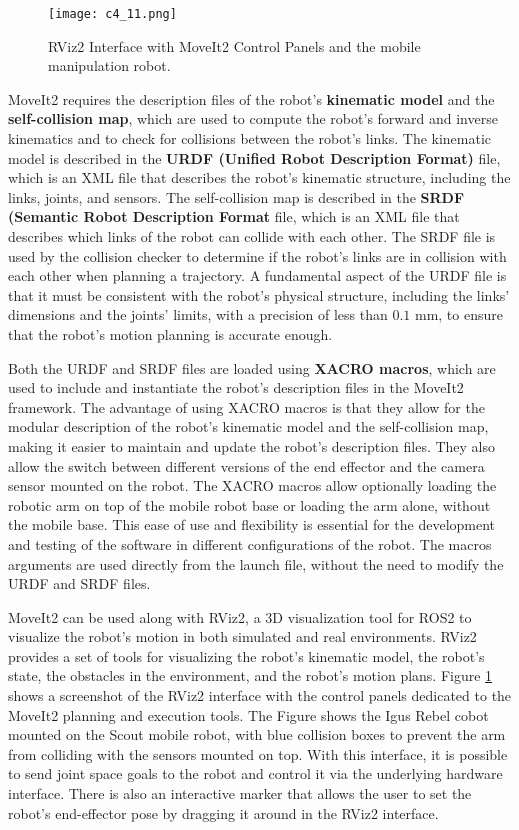 \begin{figure}[t]
    \centering
    \texttt{[image: c4\_11.png]}
    \caption{RViz2 Interface with MoveIt2 Control Panels and the mobile manipulation robot.}
    \label{fig:rviz2}
\end{figure}

MoveIt2 requires the description files of the robot's \textbf{kinematic model} and the \textbf{self-collision map},
which are used to compute the robot's forward and inverse kinematics and to check for collisions between the robot's
links. The kinematic model is described in the \textbf{URDF (Unified Robot Description Format)} file, which is an XML file
that describes the robot's kinematic structure, including the links, joints, and sensors. The self-collision map
is described in the \textbf{SRDF (Semantic Robot Description Format} file, which is an XML file that describes which links
of the robot can collide with each other. The SRDF file is used by the collision checker to determine if the robot's
links are in collision with each other when planning a trajectory. A fundamental aspect of the URDF file is that
it must be consistent with the robot's physical structure, including the links' dimensions and the joints' limits,
with a precision of less than $0.1$ mm, to ensure that the robot's motion planning is accurate enough.

Both the URDF and SRDF files are loaded using
\textbf{XACRO macros}, which are used to include and instantiate the robot's description files in the MoveIt2 framework.
The advantage of using XACRO macros is that they allow for the modular description of the robot's kinematic model
and the self-collision map, making it easier to maintain and update the robot's description files. They also allow
the switch between different versions of the end effector and the camera sensor mounted on the robot. The
XACRO macros allow optionally loading the robotic arm on top of the mobile robot base or loading the arm alone,
without the mobile base. This ease of use and flexibility is essential for the development and testing of the software
in different configurations of the robot. The macros arguments are used
directly from the launch file, without the need to modify the URDF and SRDF files.

MoveIt2 can be used along with RViz2, a 3D visualization tool for ROS2 to visualize the
robot's motion in both simulated and real environments. RViz2 provides a set of tools for visualizing the robot's
kinematic model, the robot's state, the obstacles in the environment, and the robot's motion plans.
Figure \ref{fig:rviz2} shows a screenshot of the RViz2 interface with the control panels dedicated to the MoveIt2
planning and execution tools. The Figure shows the Igus Rebel cobot mounted on the Scout mobile robot,
with blue collision boxes to prevent the arm from colliding with the sensors mounted on top.
With this interface, it is possible to send joint space goals to the robot
and control it via the underlying hardware interface. There is also an interactive marker that allows the user
to set the robot's end-effector pose by dragging it around in the RViz2 interface.

